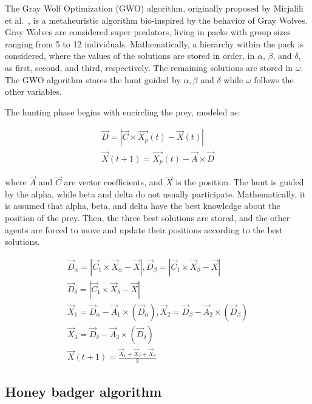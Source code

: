 \documentclass{elsarticle}
\begin{document}
The Gray Wolf Optimization (GWO) algorithm, originally proposed by Mirjalili et al.~\cite{Mirjalili2014}, is a metaheuristic algorithm bio-inspired by the behavior of Gray Wolves. Gray Wolves are considered super predators, living in packs with group sizes ranging from 5 to 12 individuals. Mathematically, a hierarchy within the pack is considered, where the values of the solutions are stored in order, in $\alpha$, $\beta$, and $\delta$, as first, second, and third, respectively. The remaining solutions are stored in $\omega$. The GWO algorithm stores the hunt guided by $\alpha,\beta$ and $\delta$ while $\omega$ follows the other variables.

The hunting phase begins with encircling the prey, modeled as:

\begin{equation}
\begin{gathered}
\vec{D} = |\vec{C} \times \vec{X_p}(t)-\vec{X}(t)|\\
\vec{X}(t+1) = \vec{X_p}(t) - \vec{A} \times \vec{D}
\end{gathered}
\label{eq25}
\end{equation}

\noindent 
where $\vec{A}$ and $\vec{C}$ are vector coefficients, and $\vec{X}$ is the position. The hunt is guided by the alpha, while beta and delta do not usually participate. Mathematically, it is assumed that alpha, beta, and delta have the best knowledge about the position of the prey. Then, the three best solutions are stored, and the other agents are forced to move and update their positions according to the best solutions.

\begin{equation}
\begin{gathered}
\vec{D}_{\alpha} = |\vec{C}_1 \times \vec{X}_{\alpha} -\vec{X}|, \vec{D}_{\beta} = |\vec{C}_1 \times \vec{X}_{\beta} -\vec{X}| \\
\vec{D}_{\delta} = |\vec{C}_1 \times \vec{X}_{\delta} -\vec{X}|\\
\vec{X}_1=\vec{D}_{\alpha}-\vec{A}_1 \times (\vec{D}_{\alpha}), \vec{X}_2=\vec{D}_{\beta}-\vec{A}_2 \times (\vec{D}_{\beta})\\
\vec{X}_3=\vec{D}_{\delta}-\vec{A}_3 \times (\vec{D}_{\delta}) \\
\vec{X}(t+1) = \frac{\vec{X}_1+\vec{X}_2+\vec{X}_3}{3}
\end{gathered}
\label{eq26}
\end{equation}

\subsection{Honey badger algorithm}
\end{document}
